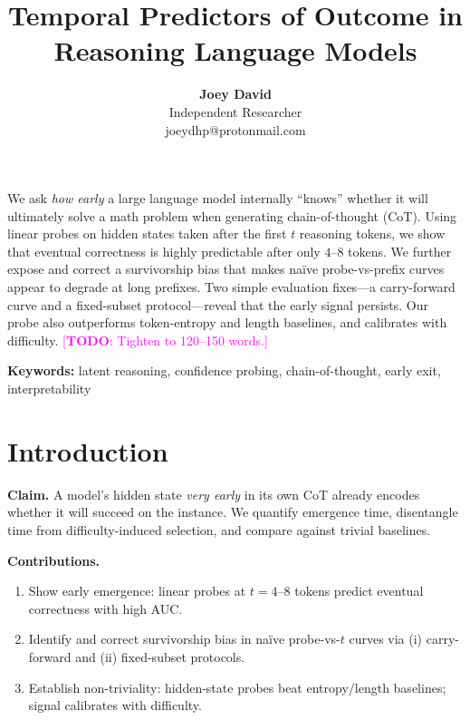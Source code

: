 \documentclass[10pt,a4paper,twocolumn]{article}
\title{Temporal Predictors of Outcome in Reasoning Language Models}
\author{
  \textbf{Joey David} \\[1pt]
  Independent Researcher \\[1pt]
  joeydhp@protonmail.com
}
\date{}
\newcommand{\todo}[1]{\textcolor{magenta}{[\textbf{TODO}: #1]}}
\begin{document}
\maketitle
\vspace{4mm}

\renewenvironment{abstract}{
  \begin{center}
  \begin{minipage}{0.9\columnwidth}
  \centering{\large\bfseries\abstractname}
  \par\vspace{4pt}
  \justifying
  \ignorespaces
}{
  \end{minipage}
  \end{center}
}

\begin{abstract}
We ask \emph{how early} a large language model internally ``knows'' whether it will ultimately solve a math problem when generating chain-of-thought (CoT). Using linear probes on hidden states taken after the first $t$ reasoning tokens, we show that eventual correctness is highly predictable after only $4$--$8$ tokens. We further expose and correct a survivorship bias that makes naïve probe-vs-prefix curves appear to degrade at long prefixes. Two simple evaluation fixes---a carry-forward curve and a fixed-subset protocol---reveal that the early signal persists. Our probe also outperforms token-entropy and length baselines, and calibrates with difficulty. \todo{Tighten to 120--150 words.}
\end{abstract}

\vspace{-2mm}
\textbf{Keywords:} latent reasoning, confidence probing, chain-of-thought, early exit, interpretability

\section{Introduction}
\label{sec:intro}
\textbf{Claim.} A model's hidden state \emph{very early} in its own CoT already encodes whether it will succeed on the instance.
We quantify emergence time, disentangle time from difficulty-induced selection, and compare against trivial baselines.

\noindent\textbf{Contributions.}
\begin{enumerate}[leftmargin=*,itemsep=2pt,topsep=2pt]
  \item Show early emergence: linear probes at $t{=}4$--$8$ tokens predict eventual correctness with high AUC.
  \item Identify and correct survivorship bias in naïve probe-vs-$t$ curves via (i) carry-forward and (ii) fixed-subset protocols.
  \item Establish non-triviality: hidden-state probes beat entropy/length baselines; signal calibrates with difficulty.
\end{enumerate}
\end{document}
